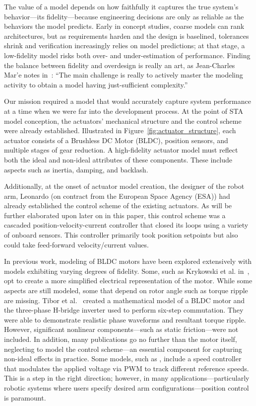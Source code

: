 \documentclass[twocolumn,letterpaper]{IEEEAerospaceCLS}  %
\begin{document}
The value of a model depends on how faithfully it captures the true system’s behavior—its fidelity—because engineering decisions are only as reliable as the behaviors the model predicts. Early in concept studies, coarse models can rank architectures, but as requirements harden and the design is baselined, tolerances shrink and verification increasingly relies on model predictions; at that stage, a low-fidelity model risks both over- and under-estimation of performance. Finding the balance between fidelity and overdesign is really an art, as Jean-Charles Mar{'e} notes in~\cite{mare2020practical}: “The main challenge is really to actively master the modeling activity to obtain a model having just-sufficient complexity.”

Our mission required a model that would accurately capture system performance at a time when we were far into the development process. At the point of STA model conception, the actuators' mechanical structure and the control scheme were already established. Illustrated in Figure~\ref{fig:actuator_structure}, each actuator consists of a Brushless DC Motor (BLDC), position sensors, and multiple stages of gear reduction. A high-fidelity actuator model must reflect both the ideal and non-ideal attributes of these components. These include aspects such as inertia, damping, and backlash.

Additionally, at the onset of actuator model creation, the designer of the robot arm, Leonardo (on contract from the European Space Agency (ESA)) had already established the control scheme of the existing actuators. As will be further elaborated upon later on in this paper, this control scheme was a cascaded position-velocity-current controller that closed its loops using a variety of onboard sensors. This controller primarily took position setpoints but also could take feed-forward velocity/current values.

In previous work, modeling of BLDC motors have been explored extensively with models exhibiting varying degrees of fidelity. Some, such as Krykowski et al. in~\textbf{\cite{krykowski2013constant}}, opt to create a more simplified electrical representation of the motor. While some aspects are still modeled, some that depend on rotor angle such as torque ripple are missing. Tibor et al.~\textbf{\cite{tibor2011modeling}} created a mathematical model of a BLDC motor and the three-phase H-bridge inverter used to perform six-step commutation. They were able to demonstrate realistic phase waveforms and resultant torque ripple. However, significant nonlinear components—such as static friction—were not included. In addition, many publications go no further than the motor itself, neglecting to model the control scheme—an essential component for capturing non-ideal effects in practice. Some models, such as \cite{pillay1989modeling}, include a speed controller that modulates the applied voltage via PWM to track different reference speeds. This is a step in the right direction; however, in many applications—particularly robotic systems where users specify desired arm configurations—position control is paramount.
\end{document}
